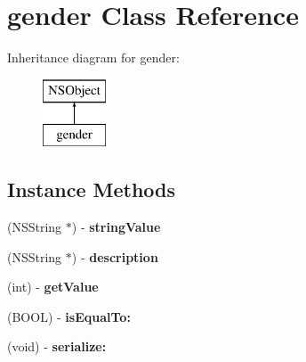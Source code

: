 \hypertarget{interfacegender}{}\section{gender Class Reference}
\label{interfacegender}
Inheritance diagram for gender\+:\begin{figure}[H]
\begin{center}
\leavevmode
\includegraphics[height=2.000000cm]{interfacegender}
\end{center}
\end{figure}
\subsection*{Instance Methods}
\begin{DoxyCompactItemize}
\item 
\hypertarget{interfacegender_a6049484ad181b5245c795b526e216380}{}(N\+S\+String $\ast$) -\/ {\bfseries string\+Value}\label{interfacegender_a6049484ad181b5245c795b526e216380}

\item 
\hypertarget{interfacegender_a1a45fa8b65fa62f7e92ceded912a1210}{}(N\+S\+String $\ast$) -\/ {\bfseries description}\label{interfacegender_a1a45fa8b65fa62f7e92ceded912a1210}

\item 
\hypertarget{interfacegender_ab5387ae5f69a95712356d30faf2bf61b}{}(int) -\/ {\bfseries get\+Value}\label{interfacegender_ab5387ae5f69a95712356d30faf2bf61b}

\item 
\hypertarget{interfacegender_ac39cae1bdda246cd2414274d80e8d357}{}(B\+O\+O\+L) -\/ {\bfseries is\+Equal\+To\+:}\label{interfacegender_ac39cae1bdda246cd2414274d80e8d357}

\item 
\hypertarget{interfacegender_a71683abbd9bf33fefb5115db67068375}{}(void) -\/ {\bfseries serialize\+:}\label{interfacegender_a71683abbd9bf33fefb5115db67068375}

\end{DoxyCompactItemize}
